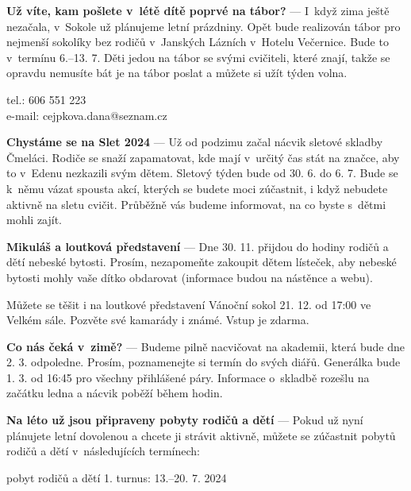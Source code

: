 \documentclass[11pt]{article}
\begin{document}
\vspace*{12pt}
\noindent
\textbf{Už víte, kam pošlete v~létě dítě poprvé na tábor?} --- I~když zima ještě nezačala, v~Sokole už plánujeme letní prázdniny. Opět bude realizován tábor pro nejmenší sokolíky bez rodičů v~Janských Lázních v~Hotelu Večernice. Bude to v~termínu 6.–13. 7. Děti jedou na tábor se svými cvičiteli, které znají, takže se opravdu nemusíte bát je na tábor poslat a můžete si užít týden volna.%

\signature{Dana Cejpková}{tel.: 606 551 223\\e-mail: cejpkova.dana@seznam.cz}

\vspace*{24pt}

\textbf{Chystáme se na Slet 2024} --- Už od podzimu začal nácvik sletové skladby Čmeláci. Rodiče se snaží zapamatovat, kde mají v~určitý čas stát na značce, aby to v~Edenu nezkazili svým dětem.
Sletový týden bude od 30. 6. do 6. 7. Bude se k~němu vázat spousta akcí, kterých se budete moci zúčastnit, i když nebudete aktivně na sletu cvičit. Průběžně vás budeme informovat, na co byste s~dětmi mohli zajít.

\vspace*{12pt}
\noindent
\textbf{Mikuláš a loutková představení} --- Dne 30. 11. přijdou do hodiny rodičů a dětí nebeské bytosti. Prosím, nezapomeňte zakoupit dětem lísteček, aby nebeské bytosti mohly vaše dítko obdarovat (informace budou na nástěnce a webu).

Můžete se těšit i na  loutkové představení  Vánoční sokol 21. 12. od 17:00 ve Velkém sále. Pozvěte své kamarády i známé. Vstup je zdarma.				
	
\vspace*{12pt}
\noindent
\textbf{Co nás čeká v~zimě?} --- Budeme pilně nacvičovat na akademii, která bude dne 2. 3. odpoledne. Prosím, poznamenejte si termín do svých diářů. Generálka bude 1. 3. od 16:45 pro všechny přihlášené páry. Informace o~skladbě rozešlu na začátku ledna a nácvik poběží během hodin. 

\vspace*{12pt}
\noindent
\textbf{Na léto už jsou připraveny pobyty rodičů a dětí} --- Pokud už nyní plánujete letní dovolenou a chcete ji strávit aktivně, můžete se zúčastnit pobytů rodičů a dětí v~následujících termínech:

\vspace*{6pt}
pobyt rodičů a dětí 1. turnus: 13.–20. 7. 2024
\end{document}
